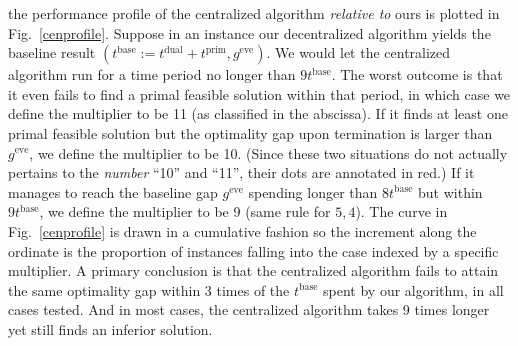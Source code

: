 \documentclass[journal]{IEEEtran}
\begin{document}
the performance profile of the centralized algorithm \textit{relative to} ours is plotted in Fig.~\ref{cenprofile}.
Suppose in an instance our decentralized algorithm yields the baseline result $(t^\text{base} := t^\text{dual} + t^\text{prim}, g^\text{eve})$.
We would let the centralized algorithm run for a time period no longer than $9t^\text{base}$.
The worst outcome is that it even fails to find a primal feasible solution within that period, in which case we define
the multiplier to be 11 (as classified in the abscissa).
If it finds at least one primal feasible solution but the optimality gap upon termination is larger than $g^\text{eve}$,
we define the multiplier to be 10. 
(Since these two situations do not actually pertains to the \textit{number} ``10'' and ``11'', their dots are annotated in red.)
If it manages to reach the baseline gap $g^\text{eve}$ spending longer than $8t^\text{base}$ but within $9t^\text{base}$,
we define the multiplier to be 9 (same rule for $5, 4$).
The curve in Fig.~\ref{cenprofile} is drawn in a cumulative fashion so the increment along the ordinate
is the proportion of instances falling into the case indexed by a specific multiplier.
A primary conclusion is that the centralized algorithm fails to attain the same optimality gap within
3 times of the $t^\text{base}$ spent by our algorithm, in all cases tested.
And in most cases, the centralized algorithm takes 9 times longer yet still finds an inferior solution.
\end{document}
